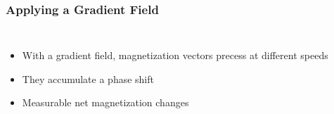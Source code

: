 \begin{frame}
	\frametitle{Applying a Gradient Field}
	
	\begin{columns}[onlytextwidth,c]
		\begin{itemize}
			\item With a gradient field, magnetization vectors precess at different speeds
			\item They accumulate a phase shift
			\item Measurable net magnetization changes
		\end{itemize}
	\end{columns}
	
	
	
	\begin{center}
		\begingroup
		
		\endgroup
	\end{center}
	
\end{frame}

%	
%		
%		
%	
%	
%		
%		

